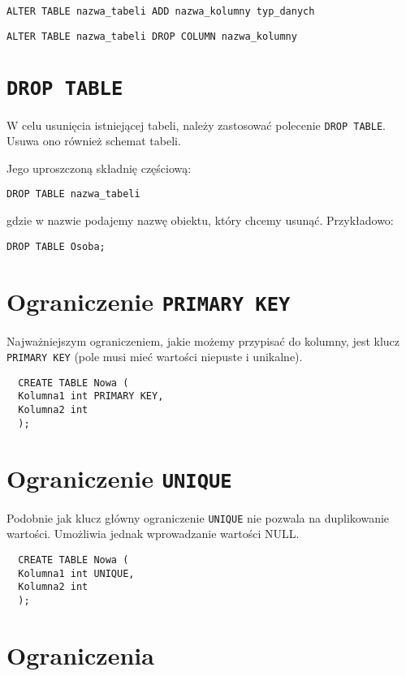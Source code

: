 \documentclass[a4paper]{article}
\begin{document}
\begin{verbatim}
ALTER TABLE nazwa_tabeli ADD nazwa_kolumny typ_danych
\end{verbatim}

\begin{verbatim}
ALTER TABLE nazwa_tabeli DROP COLUMN nazwa_kolumny
\end{verbatim}

\section{\tt DROP TABLE}

W celu usunięcia istniejącej tabeli, należy zastosować polecenie {\tt DROP TABLE}. Usuwa ono również schemat tabeli.

Jego uproszczoną składnię częściową:
\begin{verbatim}
DROP TABLE nazwa_tabeli
\end{verbatim}
gdzie w nazwie podajemy nazwę obiektu, który chcemy usunąć. Przykładowo:
\begin{verbatim}
DROP TABLE Osoba;
\end{verbatim}

\section{Ograniczenie {\tt PRIMARY KEY}}

Najważniejszym ograniczeniem, jakie możemy przypisać do kolumny, jest klucz {\tt PRIMARY KEY} (pole musi mieć wartości niepuste i unikalne).

\begin{verbatim}
  CREATE TABLE Nowa (
  Kolumna1 int PRIMARY KEY,
  Kolumna2 int
  );
\end{verbatim}

\section{Ograniczenie {\tt UNIQUE}}

Podobnie jak klucz główny ograniczenie {\tt UNIQUE} nie pozwala na duplikowanie wartości. Umożliwia jednak wprowadzanie wartości NULL.\@

\begin{verbatim}
  CREATE TABLE Nowa (
  Kolumna1 int UNIQUE,
  Kolumna2 int
  );
\end{verbatim}

\section{Ograniczenia}
\end{document}
